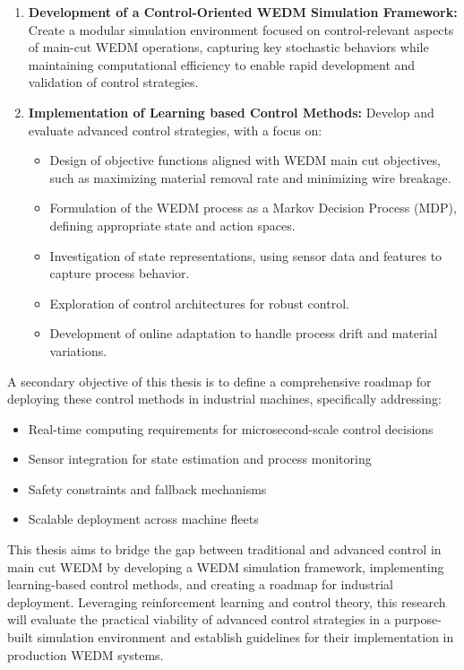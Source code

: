 \documentclass[11pt]{article}
\begin{document}
\begin{enumerate}
    \item \textbf{Development of a Control-Oriented WEDM Simulation Framework:} Create a modular simulation environment focused on control-relevant aspects of main-cut WEDM operations, capturing key stochastic behaviors while maintaining computational efficiency to enable rapid development and validation of control strategies.

    \item \textbf{Implementation of Learning based Control Methods:} Develop and evaluate advanced control strategies, with a focus on:
    \begin{itemize}
        \item Design of objective functions aligned with WEDM main cut objectives, such as maximizing material removal rate and minimizing wire breakage.
        \item Formulation of the WEDM process as a Markov Decision Process (MDP), defining appropriate state and action spaces.
        \item Investigation of state representations, using sensor data and features to capture process behavior.
        \item Exploration of control architectures for robust control.
        \item Development of online adaptation to handle process drift and material variations.
    \end{itemize}


\end{enumerate}


A secondary objective of this thesis is to define a comprehensive roadmap for deploying these control methods in industrial machines, specifically addressing:
\begin{itemize}
    \item Real-time computing requirements for microsecond-scale control decisions
    \item Sensor integration for state estimation and process monitoring
    \item Safety constraints and fallback mechanisms
    \item Scalable deployment across machine fleets
\end{itemize}

This thesis aims to bridge the gap between traditional and advanced control in main cut WEDM by developing a WEDM simulation framework, implementing learning-based control methods, and creating a roadmap for industrial deployment. Leveraging reinforcement learning and control theory, this research will evaluate the practical viability of advanced control strategies in a purpose-built simulation environment and establish guidelines for their implementation in production WEDM systems.
\end{document}
